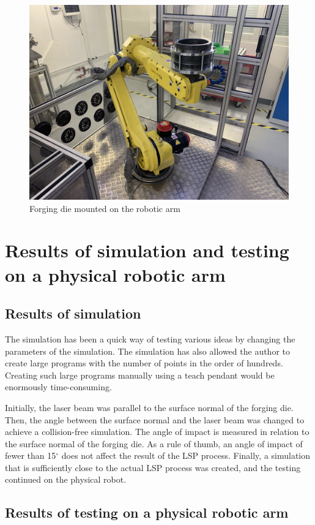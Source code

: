 \begin{figure}[h]
    \centering
    \includegraphics[width=0.9\linewidth]{img/cast.jpeg}
    \caption{Forging die mounted on the robotic arm}
    \label{fig:cast}
\end{figure}

\section{Results of simulation and testing on a physical robotic arm}

\subsection{Results of simulation}

The simulation has been a quick way of testing various ideas by changing the parameters of the simulation. The simulation has also allowed the author to create large programs with the number of points in the order of hundreds. Creating such large programs manually using a teach pendant would be enormously time-consuming. 

Initially, the laser beam was parallel to the surface normal of the forging die. Then, the angle between the surface normal and the laser beam was changed to achieve a collision-free simulation. The angle of impact is measured in relation to the surface normal of the forging die. As a rule of thumb, an angle of impact of fewer than 15$^{\circ}$ does not affect the result of the LSP process.  Finally, a simulation that is sufficiently close to the actual LSP process was created, and the testing continued on the physical robot.

\subsection{Results of testing on a physical robotic arm}

